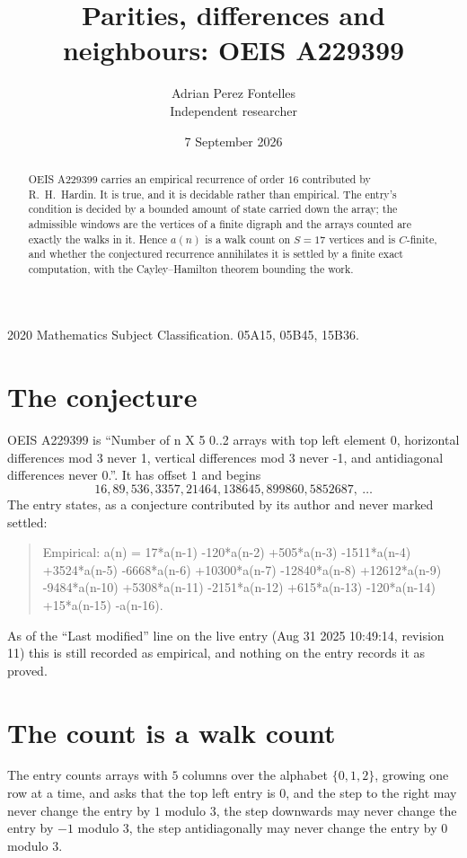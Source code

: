 \documentclass[11pt,a4paper]{article}
\title{Parities, differences and neighbours: OEIS A229399}
\author{Adrian Perez Fontelles\\ \small Independent researcher}
\date{7 September 2026}
\theoremstyle{plain}
\theoremstyle{definition}
\begin{document}
\maketitle

\begin{abstract}
OEIS A229399 carries an empirical recurrence of order $16$ contributed by R.~H.~Hardin. It is
true, and it is decidable rather than empirical. The entry's condition is decided by a bounded amount of state carried down the array; the
admissible windows are the vertices of a finite digraph and the arrays counted are exactly the
walks in it. Hence $a(n)$ is a walk count on $S=17$ vertices and is $C$-finite, and whether the
conjectured recurrence annihilates it is settled by a finite exact computation, with the
Cayley--Hamilton theorem bounding the work.
\end{abstract}

\noindent\small 2020 Mathematics Subject Classification. 05A15, 05B45, 15B36.\normalsize

\section{The conjecture}

OEIS A229399 is ``Number of n X 5 0..2 arrays with top left element 0, horizontal differences mod 3 never 1, vertical differences mod 3 never -1, and antidiagonal differences never 0.''. It has offset $1$ and begins
\[
16, 89, 536, 3357, 21464, 138645, 899860, 5852687,\ \dots
\]
The entry states, as a conjecture contributed by its author and never marked settled:
\begin{quote}
Empirical: a(n) = 17*a(n-1) -120*a(n-2) +505*a(n-3) -1511*a(n-4) +3524*a(n-5) -6668*a(n-6) +10300*a(n-7) -12840*a(n-8) +12612*a(n-9) -9484*a(n-10) +5308*a(n-11) -2151*a(n-12) +615*a(n-13) -120*a(n-14) +15*a(n-15) -a(n-16).
\end{quote}
As of the ``Last modified'' line on the live entry (Aug 31 2025 10:49:14, revision 11) this is still
recorded as empirical, and nothing on the entry records it as proved.

\section{The count is a walk count}

The entry counts arrays with $5$ columns over the alphabet $\{0,1,2\}$, growing one row at a time, and asks that the top left entry is $0$, and the step to the right may never change the entry by $1$ modulo $3$, the step downwards may never change the entry by $-1$ modulo $3$, the step antidiagonally may never change the entry by $0$ modulo $3$.
\end{document}
